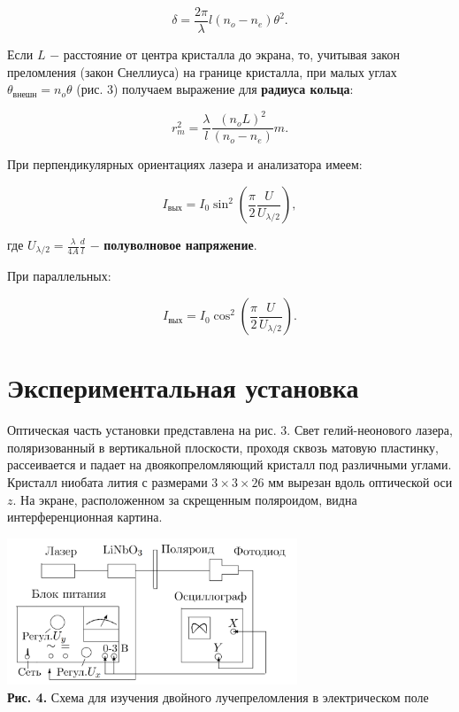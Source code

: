\documentclass[a4paper,12pt]{article} %
\begin{document}
\begin{equation}
	\delta = \frac{2\pi}{\lambda}l(n_o - n_e)\theta^2.
\end{equation}

\hfill \break Если $L$ $-$ расстояние от центра кристалла до экрана, то, учитывая закон преломления (закон Снеллиуса) на границе кристалла, при малых углах $\theta_{\text{внешн}} = n_o \theta$ (рис. 3) получаем выражение для \textbf{радиуса кольца}:
	
\begin{equation}
	r_m^2 = \frac{\lambda}{l}\frac{(n_o L)^2}{(n_o - n_e)}m.
\end{equation}

\hfill \break При перпендикулярных ориентациях лазера и анализатора имеем:
	
\begin{equation}
	I_{\text{вых}} = I_0\sin^2\left(\frac{\pi}{2}\frac{U}{U_{\lambda / 2}}\right), 
\end{equation}

\hfill \break где $U_{\lambda / 2} = \frac{\lambda}{4A} \frac{d}{l}$ $-$ \textbf{полуволновое напряжение}.

\hfill \break При параллельных:
	
\begin{equation}
	I_{\text{вых}} = I_0\cos^2\left(\frac{\pi}{2}\frac{U}{U_{\lambda / 2}}\right).
\end{equation}

\section{Экспериментальная установка}
\hfill \break Оптическая часть установки представлена на рис. 3. Свет гелий-неонового лазера, поляризованный в вертикальной плоскости, проходя сквозь матовую пластинку, рассеивается и падает на двоякопреломляющий кристалл под различными углами. Кристалл ниобата лития с размерами $3 \times 3 \times 26$ мм вырезан вдоль оптической оси $z$. На экране, расположенном за скрещенным поляроидом, видна интерференционная картина.

\begin{center}
\includegraphics[width=0.65\textwidth]{4.7.2_4.png}\\
\textbf{Рис. 4.} Схема для изучения двойного лучепреломления в электрическом поле \\
\end{center}
\end{document}
